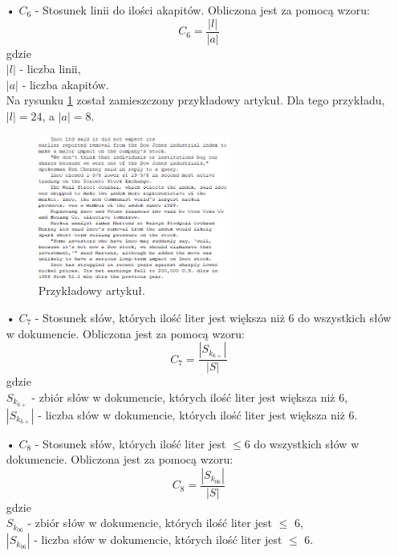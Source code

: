 \documentclass{classrep}
\begin{document}
\begin{itemize}
\item[•] $C_6$ - Stosunek linii do ilości akapitów. Obliczona jest za pomocą wzoru:
\begin{equation} C_{6} = \frac{|l|}{|a|}  \end{equation} gdzie \\
$|l|$ - liczba linii,\\
$|a|$ - liczba akapitów.\\
Na rysunku \ref{c6png} został zamieszczony przykładowy artykuł. Dla tego przykładu, $|l| = 24$, a $|a| = 8$. \\
\begin{figure}[h!]
	\centering
	\includegraphics[width=0.6\textwidth]{c6.png}
	\caption{Przykładowy artykuł.}
	\label{c6png}
\end{figure}

\item[•] $C_7$ - Stosunek słów, których ilość liter jest większa niż 6 do wszystkich słów w dokumencie. Obliczona jest za pomocą wzoru:
\begin{equation} C_7 = \frac{|S_{k_{6+}}|}{|S|}  \end{equation} gdzie \\
$S_{k_{6+}}$ - zbiór słów w dokumencie, których ilość liter jest większa niż 6, \\
$|S_{k_{6+}}|$ - liczba słów w dokumencie, których ilość liter jest większa niż 6. \\

\item[•] $C_8$ - Stosunek słów, których ilość liter jest $\leq$6 do wszystkich słów w dokumencie. Obliczona jest za pomocą wzoru:
\begin{equation} C_8 = \frac{|S_{k_{06}}|}{|S|}  \end{equation} gdzie \\
$S_{k_{06}}$ - zbiór słów w dokumencie, których ilość liter jest $\leq$ 6, \\
$|S_{k_{06}}|$ - liczba słów w dokumencie, których ilość liter jest $\leq$ 6. \\


\end{itemize}
\end{document}
